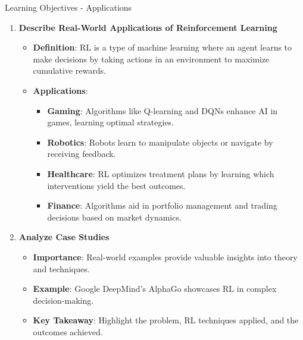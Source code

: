\documentclass[aspectratio=169]{beamer}
\begin{document}
\begin{frame}[fragile]{Learning Objectives - Applications}
  \begin{enumerate}
    \item \textbf{Describe Real-World Applications of Reinforcement Learning}
      \begin{itemize}
        \item \textbf{Definition}: RL is a type of machine learning where an agent learns to make decisions by taking actions in an environment to maximize cumulative rewards.
        \item \textbf{Applications}:
          \begin{itemize}
            \item \textbf{Gaming}: Algorithms like Q-learning and DQNs enhance AI in games, learning optimal strategies.
            \item \textbf{Robotics}: Robots learn to manipulate objects or navigate by receiving feedback.
            \item \textbf{Healthcare}: RL optimizes treatment plans by learning which interventions yield the best outcomes.
            \item \textbf{Finance}: Algorithms aid in portfolio management and trading decisions based on market dynamics.
          \end{itemize}
      \end{itemize}

    \item \textbf{Analyze Case Studies}
      \begin{itemize}
        \item \textbf{Importance}: Real-world examples provide valuable insights into theory and techniques.
        \item \textbf{Example}: Google DeepMind's AlphaGo showcases RL in complex decision-making.
        \item \textbf{Key Takeaway}: Highlight the problem, RL techniques applied, and the outcomes achieved.
      \end{itemize}
  \end{enumerate}
\end{frame}
\end{document}
